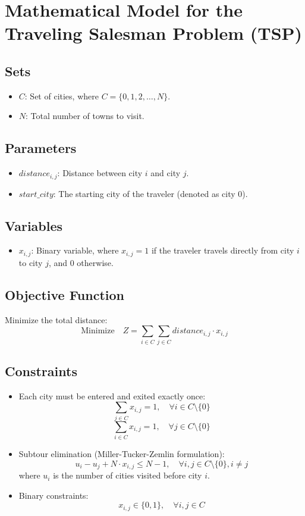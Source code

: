 \documentclass{article}
\begin{document}
\section*{Mathematical Model for the Traveling Salesman Problem (TSP)}

\subsection*{Sets}
\begin{itemize}
    \item $C$: Set of cities, where $C = \{0, 1, 2, \ldots, N\}$.
    \item $N$: Total number of towns to visit.
\end{itemize}

\subsection*{Parameters}
\begin{itemize}
    \item $distance_{i,j}$: Distance between city $i$ and city $j$.
    \item $start\_city$: The starting city of the traveler (denoted as city 0).
\end{itemize}

\subsection*{Variables}
\begin{itemize}
    \item $x_{i,j}$: Binary variable, where $x_{i,j} = 1$ if the traveler travels directly from city $i$ to city $j$, and $0$ otherwise.
    \end{itemize}

\subsection*{Objective Function}
Minimize the total distance:
\[
\text{Minimize} \quad Z = \sum_{i \in C} \sum_{j \in C} distance_{i,j} \cdot x_{i,j}
\]

\subsection*{Constraints}
\begin{itemize}
    \item Each city must be entered and exited exactly once:
    \[
    \sum_{j \in C} x_{i,j} = 1, \quad \forall i \in C \setminus \{0\}
    \]
    \[
    \sum_{i \in C} x_{i,j} = 1, \quad \forall j \in C \setminus \{0\}
    \]

    \item Subtour elimination (Miller-Tucker-Zemlin formulation):
    \[
    u_i - u_j + N \cdot x_{i,j} \leq N-1, \quad \forall i,j \in C \setminus \{0\}, i \neq j
    \]
    where $u_i$ is the number of cities visited before city $i$.
    
    \item Binary constraints:
    \[
    x_{i,j} \in \{0, 1\}, \quad \forall i,j \in C
    \]
\end{itemize}
\end{document}
